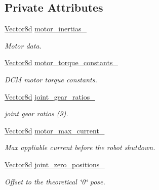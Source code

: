 \subsection*{Private Attributes}
\begin{DoxyCompactItemize}
\item 
\hyperlink{common__header_8hpp_a98975ffbe0bca1296078e0350dfedd60}{Vector8d} \hyperlink{classblmc__robots_1_1Solo8_ad2a475dd31443243c1683c2fb091418e}{motor\+\_\+inertias\+\_\+}
\begin{DoxyCompactList}\small\item\em Motor data. \end{DoxyCompactList}\item 
\hyperlink{common__header_8hpp_a98975ffbe0bca1296078e0350dfedd60}{Vector8d} \hyperlink{classblmc__robots_1_1Solo8_a21293b97b37bcd42b3e3766a72fabf26}{motor\+\_\+torque\+\_\+constants\+\_\+}
\begin{DoxyCompactList}\small\item\em D\+CM motor torque constants. \end{DoxyCompactList}\item 
\hyperlink{common__header_8hpp_a98975ffbe0bca1296078e0350dfedd60}{Vector8d} \hyperlink{classblmc__robots_1_1Solo8_a09ab41c9822e1f1c853d0b9065205d2d}{joint\+\_\+gear\+\_\+ratios\+\_\+}
\begin{DoxyCompactList}\small\item\em joint gear ratios (9). \end{DoxyCompactList}\item 
\hyperlink{common__header_8hpp_a98975ffbe0bca1296078e0350dfedd60}{Vector8d} \hyperlink{classblmc__robots_1_1Solo8_af9b0800cd9ef22713767298ef850eddf}{motor\+\_\+max\+\_\+current\+\_\+}
\begin{DoxyCompactList}\small\item\em Max appliable current before the robot shutdown. \end{DoxyCompactList}\item 
\hyperlink{common__header_8hpp_a98975ffbe0bca1296078e0350dfedd60}{Vector8d} \hyperlink{classblmc__robots_1_1Solo8_a31f29f1bf604552b2ae5d017e5f3e2d1}{joint\+\_\+zero\+\_\+positions\+\_\+}
\begin{DoxyCompactList}\small\item\em Offset to the theoretical \char`\"{}0\char`\"{} pose. \end{DoxyCompactList}\item 
\mbox{\label{classblmc__robots_1_1Solo8_a053f46bebf56986d976e34c0c47956c9}} 

\end{DoxyCompactItemize}
